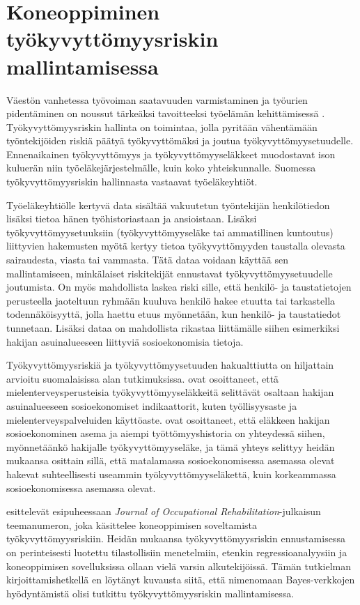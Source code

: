 \chapter{Koneoppiminen työkyvyttömyysriskin mallintamisessa\label{applications}}

Väestön vanhetessa työvoiman saatavuuden varmistaminen ja työurien pidentäminen on noussut tärkeäksi tavoitteeksi työelämän kehittämisessä \citep{noauthor_paaministeri_2019}. Työkyvyttömyysriskin hallinta on toimintaa, jolla pyritään vähentämään työntekijöiden riskiä päätyä työkyvyttömäksi ja joutua työkyvyttömyysetuudelle. Ennenaikainen työkyvyttömyys ja työkyvyttömyyseläkkeet muodostavat ison kuluerän niin työeläkejärjestelmälle, kuin koko yhteiskunnalle. Suomessa työkyvyttömyysriskin hallinnasta vastaavat työeläkeyhtiöt.

Työeläkeyhtiölle kertyvä data sisältää vakuutetun työntekijän henkilötiedon lisäksi tietoa hänen työhistoriastaan ja ansioistaan. Lisäksi työkyvyttömyysetuuksiin (työkyvyttömyyseläke tai ammatillinen kuntoutus) liittyvien hakemusten myötä kertyy tietoa työkyvyttömyyden taustalla olevasta sairaudesta, viasta tai vammasta. Tätä dataa voidaan käyttää sen mallintamiseen, minkälaiset riskitekijät ennustavat työkyvyttömyysetuudelle joutumista. On myös mahdollista laskea riski sille, että henkilö- ja taustatietojen perusteella jaoteltuun ryhmään kuuluva henkilö hakee etuutta tai tarkastella todennäköisyyttä, jolla haettu etuus myönnetään, kun henkilö- ja taustatiedot tunnetaan. Lisäksi dataa on mahdollista rikastaa liittämälle siihen esimerkiksi hakijan asuinalueeseen liittyviä sosioekonomisia tietoja.

Työkyvyttömyysriskiä ja työkyvyttömyysetuuden hakualttiutta on hiljattain arvioitu suomalaisissa alan tutkimuksissa. \citet{karolaakso_contextual_2021, karolaakso_socioeconomic_2020} ovat osoittaneet, että mielenterveysperusteisia työkyvyttömyyseläkkeitä selittävät osaltaan hakijan asuinalueeseen sosioekonomiset indikaattorit, kuten työllisyysaste ja mielenterveyspalveluiden käyttöaste. \citet{perhoniemi_determinants_2020, perhoniemi_tyokyvyttomyyselakehakemusten_2020} ovat osoittaneet, että eläkkeen hakijan sosioekonominen asema ja aiempi työttömyyshistoria on yhteydessä siihen, myönnetäänkö hakijalle työkyvyttömyyseläke, ja tämä yhteys selittyy heidän mukaansa osittain sillä, että matalamassa sosioekonomisessa asemassa olevat hakevat suhteellisesti useammin työkyvyttömyyseläkettä, kuin korkeammassa sosioekonomisessa asemassa olevat.

\citet{gross_machine_2020} esittelevät esipuheessaan \emph{Journal of Occupational Rehabilitation}-julkaisun teemanumeron, joka käsittelee koneoppimisen soveltamista työkyvyttömyysriskiin. Heidän mukaansa työkyvyttömyysriskin ennustamisessa on perinteisesti luotettu tilastollisiin menetelmiin, etenkin regressioanalyysiin ja koneoppimisen sovelluksissa ollaan vielä varsin alkutekijöissä. Tämän tutkielman kirjoittamishetkellä en löytänyt kuvausta siitä, että nimenomaan Bayes-verkkojen hyödyntämistä olisi tutkittu työkyvyttömyysriskin mallintamisessa. 

